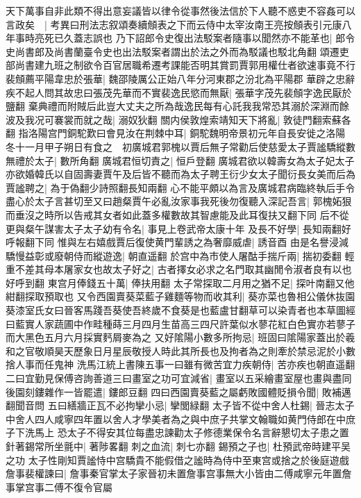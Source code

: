 天下萬事自非此類不得出意妄議皆以律令從事然後法信於下人聽不惑吏不容姦可以言政矣　|{
	考異曰刑法志叙頌奏續頠表之下而云侍中太宰汝南王亮按頠表引元康八年事時亮死已久蓋志誤也}
乃下詔郎令史復出法駁案者隨事以聞然亦不能革也|{
	郎令史尚書郎及尚書蘭臺令史也出法駁案者謂出於法之外而為駁議也駁北角翻}
頌遷吏部尚書建九班之制欲令百官居職希遷考課能否明其賞罰賈郭用權仕者欲速事竟不行裴頠薦平陽韋忠於張華|{
	魏邵陵厲公正始八年分河東郡之汾北為平陽郡}
華辟之忠辭疾不起人問其故忠曰張茂先華而不實裴逸民慾而無厭|{
	張華字茂先裴頠字逸民厭於鹽翻}
棄典禮而附賊后此豈大丈夫之所為哉逸民每有心託我我常恐其溺於深淵而餘波及我况可褰裳而就之哉|{
	溺奴狄翻}
關内侯敦煌索靖知天下將亂|{
	敦徒門翻索蘇各翻}
指洛陽宫門銅駝歎曰會見汝在荆棘中耳|{
	銅駝魏明帝景初元年自長安徙之洛陽}
冬十一月甲子朔日有食之　初廣城君郭槐以賈后無子常勸后使慈愛太子賈謐驕縱數無禮於太子|{
	數所角翻}
廣城君恒切責之|{
	恒戶登翻}
廣城君欲以韓壽女為太子妃太子亦欲婚韓氏以自固壽妻賈午及后皆不聽而為太子聘王衍少女太子聞衍長女美而后為賈謐聘之|{
	為于偽翻少詩照翻長知兩翻}
心不能平頗以為言及廣城君病臨終執后手令盡心於太子言甚切至又曰趙粲賈午必亂汝家事我死後勿復聽入深記吾言|{
	郭槐妬狠而垂沒之時所以告戒其女者如此蓋多權數故其智慮能及此耳復扶又翻下同}
后不從更與粲午謀害太子太子幼有令名|{
	事見上卷武帝太康十年}
及長不好學|{
	長知兩翻好呼報翻下同}
惟與左右嬉戲賈后復使黄門輩誘之為奢靡威虐|{
	誘音酉}
由是名譽浸減驕慢益彰或廢朝侍而縱遊逸|{
	朝直遥翻}
於宫中為市使人屠酤手揣斤兩|{
	揣初委翻}
輕重不差其母本屠家女也故太子好之|{
	古者擇女必求之名門取其幽閒令淑者良有以也好呼到翻}
東宫月俸錢五十萬|{
	俸扶用翻}
太子常探取二月用之猶不足|{
	探叶南翻又他紺翻探取預取也}
又令西園賣葵菜藍子雞麵等物而收其利|{
	葵亦菜也魯相公儀休抜園葵漆室氏女曰晉客馬踐吾葵使吾終歲不食葵是也藍盧甘翻草可以染青者也本草圖經曰藍實人家蔬圃中作畦種蒔三月四月生苗高三四尺許葉似水蓼花紅白色實亦若蓼子而大黑色五月六月採實麫屑麥為之}
又好隂陽小數多所拘忌|{
	班固曰隂陽家蓋出於羲和之官敬順昊天歷象日月星辰敬授人時此其所長也及拘者為之則牽於禁忌泥於小數捨人事而任鬼神}
洗馬江統上書陳五事一曰雖有微苦宜力疾朝侍|{
	苦亦疾也朝直遥翻}
二曰宜勤見保傅咨詢善道三曰畫室之功可宜減省|{
	畫室以五采繪畫室屋也畫與盡同}
後園刻鏤雜作一皆罷遣|{
	鏤郎豆翻}
四曰西園賣葵藍之屬虧敗國體貶損令聞|{
	敗補邁翻聞音問}
五曰繕牆正瓦不必拘攣小忌|{
	攣閭緑翻}
太子皆不從中舍人杜錫|{
	晉志太子中舍人四人咸寧四年置以舍人才學美者為之與中庶子共掌文翰職如黄門侍郎在中庶子下洗馬上}
恐太子不得安其位每盡忠諫勸太子修德業保令名言辭懇切太子患之置針著錫常所坐氈中|{
	著陟畧翻}
刺之血流|{
	刺七亦翻}
錫預之子也|{
	杜預武帝時建平吴之功}
太子性剛知賈謐恃中宫驕貴不能假借之謐時為侍中至東宫或捨之於後庭遊戲詹事裴權諫曰|{
	詹事秦官掌太子家晉初未置詹事宫事無大小皆由二傅咸寧元年置詹事掌宫事二傅不復令官屬}
